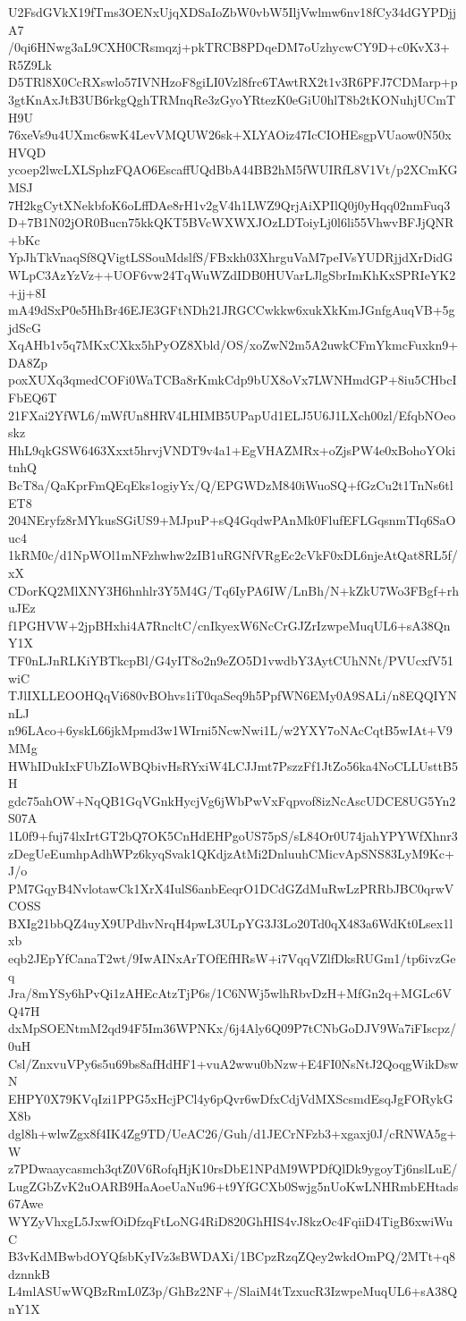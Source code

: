 U2FsdGVkX19fTms3OENxUjqXDSaIoZbW0vbW5IljVwlmw6nv18fCy34dGYPDjjA7
/0qi6HNwg3aL9CXH0CRsmqzj+pkTRCB8PDqeDM7oUzhycwCY9D+c0KvX3+R5Z9Lk
D5TRl8X0CcRXswlo57IVNHzoF8giLI0Vzl8frc6TAwtRX2t1v3R6PFJ7CDMarp+p
3gtKnAxJtB3UB6rkgQghTRMnqRe3zGyoYRtezK0eGiU0hlT8b2tKONuhjUCmTH9U
76xeVs9u4UXmc6swK4LevVMQUW26sk+XLYAOiz47IcCIOHEsgpVUaow0N50xHVQD
ycoep2lwcLXLSphzFQAO6EscaffUQdBbA44BB2hM5fWUIRfL8V1Vt/p2XCmKGMSJ
7H2kgCytXNekbfoK6oLffDAe8rH1v2gV4h1LWZ9QrjAiXPIlQ0j0yHqq02nmFuq3
D+7B1N02jOR0Bucn75kkQKT5BVcWXWXJOzLDToiyLj0l6li55VhwvBFJjQNR+bKc
YpJhTkVnaqSf8QVigtLSSouMdslfS/FBxkh03XhrguVaM7peIVsYUDRjjdXrDidG
WLpC3AzYzVz++UOF6vw24TqWuWZdIDB0HUVarLJlgSbrImKhKxSPRIeYK2+jj+8I
mA49dSxP0e5HhBr46EJE3GFtNDh21JRGCCwkkw6xukXkKmJGnfgAuqVB+5gjdScG
XqAHb1v5q7MKxCXkx5hPyOZ8Xbld/OS/xoZwN2m5A2uwkCFmYkmcFuxkn9+DA8Zp
poxXUXq3qmedCOFi0WaTCBa8rKmkCdp9bUX8oVx7LWNHmdGP+8iu5CHbcIFbEQ6T
21FXai2YfWL6/mWfUn8HRV4LHIMB5UPapUd1ELJ5U6J1LXch00zl/EfqbNOeoskz
HhL9qkGSW6463Xxxt5hrvjVNDT9v4a1+EgVHAZMRx+oZjsPW4e0xBohoYOkitnhQ
BcT8a/QaKprFmQEqEks1ogiyYx/Q/EPGWDzM840iWuoSQ+fGzCu2t1TnNs6tlET8
204NEryfz8rMYkusSGiUS9+MJpuP+sQ4GqdwPAnMk0FlufEFLGqsnmTIq6SaOuc4
1kRM0c/d1NpWOl1mNFzhwhw2zIB1uRGNfVRgEc2cVkF0xDL6njeAtQat8RL5f/xX
CDorKQ2MlXNY3H6hnhlr3Y5M4G/Tq6IyPA6IW/LnBh/N+kZkU7Wo3FBgf+rhuJEz
f1PGHVW+2jpBHxhi4A7RncltC/cnIkyexW6NcCrGJZrIzwpeMuqUL6+sA38QnY1X
TF0nLJnRLKiYBTkcpBl/G4yIT8o2n9eZO5D1vwdbY3AytCUhNNt/PVUcxfV51wiC
TJlIXLLEOOHQqVi680vBOhvs1iT0qaSeq9h5PpfWN6EMy0A9SALi/n8EQQIYNnLJ
n96LAco+6yskL66jkMpmd3w1WIrni5NcwNwi1L/w2YXY7oNAcCqtB5wIAt+V9MMg
HWhIDukIxFUbZIoWBQbivHsRYxiW4LCJJmt7PszzFf1JtZo56ka4NoCLLUsttB5H
gdc75ahOW+NqQB1GqVGnkHycjVg6jWbPwVxFqpvof8izNcAscUDCE8UG5Yn2S07A
1L0f9+fuj74lxIrtGT2bQ7OK5CnHdEHPgoUS75pS/sL84Or0U74jahYPYWfXhnr3
zDegUeEumhpAdhWPz6kyqSvak1QKdjzAtMi2DnluuhCMicvApSNS83LyM9Kc+J/o
PM7GqyB4NvlotawCk1XrX4IulS6anbEeqrO1DCdGZdMuRwLzPRRbJBC0qrwVCOSS
BXIg21bbQZ4uyX9UPdhvNrqH4pwL3ULpYG3J3Lo20Td0qX483a6WdKt0Lsex1lxb
eqb2JEpYfCanaT2wt/9IwAINxArTOfEfHRsW+i7VqqVZlfDksRUGm1/tp6ivzGeq
Jra/8mYSy6hPvQi1zAHEcAtzTjP6s/1C6NWj5wlhRbvDzH+MfGn2q+MGLc6VQ47H
dxMpSOENtmM2qd94F5Im36WPNKx/6j4Aly6Q09P7tCNbGoDJV9Wa7iFIscpz/0uH
Csl/ZnxvuVPy6s5u69bs8afHdHF1+vuA2wwu0bNzw+E4FI0NsNtJ2QoqgWikDswN
EHPY0X79KVqIzi1PPG5xHcjPCl4y6pQvr6wDfxCdjVdMXScsmdEsqJgFORykGX8b
dgl8h+wlwZgx8f4IK4Zg9TD/UeAC26/Guh/d1JECrNFzb3+xgaxj0J/cRNWA5g+W
z7PDwaaycasmch3qtZ0V6RofqHjK10rsDbE1NPdM9WPDfQlDk9ygoyTj6nslLuE/
LugZGbZvK2uOARB9HaAoeUaNu96+t9YfGCXb0Swjg5nUoKwLNHRmbEHtads67Awe
WYZyVhxgL5JxwfOiDfzqFtLoNG4RiD820GhHIS4vJ8kzOc4FqiiD4TigB6xwiWuC
B3vKdMBwbdOYQfsbKyIVz3sBWDAXi/1BCpzRzqZQey2wkdOmPQ/2MTt+q8dznnkB
L4mlASUwWQBzRmL0Z3p/GhBz2NF+/SlaiM4tTzxucR3IzwpeMuqUL6+sA38QnY1X
